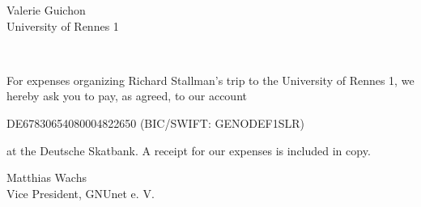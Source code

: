 \documentclass[DIN, pagenumber=false, parskip=half,
               fromalign=right, fromphone=false, fromfax=false, frombank=true,
               yourmail=false,
               yourref=false,
               fromrule=false]{scrlttr2}
\begin{document}
\begin{letter}{
        Valerie Guichon \\
	University of Rennes 1 \\
}

\opening{\ }
\vspace{-1.5cm}

For expenses organizing Richard Stallman's trip to the University of Rennes 1,
we hereby ask you to pay, as agreed,  to our account

\begin{center}
  DE67830654080004822650 (BIC/SWIFT: GENODEF1SLR)
\end{center}
at the Deutsche Skatbank.  A receipt for our expenses is included in copy.


\vspace{3cm}
Matthias Wachs\\
Vice President, GNUnet e. V.


\end{letter}
\end{document}

